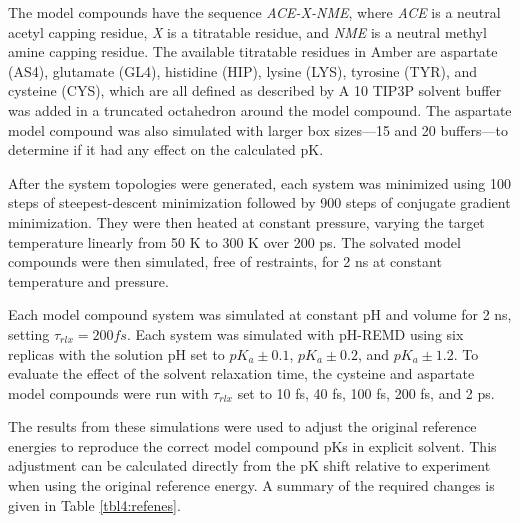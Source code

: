 The model compounds have the sequence \emph{ACE-X-NME}, where \emph{ACE} is a
neutral acetyl capping residue, \emph{X} is a titratable residue, and \emph{NME}
is a neutral methyl amine capping residue.
\cite{Mongan_JComputChem_2004_v25_p2038} The available titratable residues in
Amber are aspartate (AS4), glutamate (GL4), histidine (HIP), lysine (LYS),
tyrosine (TYR), and cysteine (CYS), which are all defined as described by
\citeauthor{Mongan_JComputChem_2004_v25_p2038}
\cite{Mongan_JComputChem_2004_v25_p2038}  A 10 \text{\AA} TIP3P
\cite{Jorgensen_JChemPhys_1983_v79_p926} solvent buffer was added in a truncated
octahedron around the model compound.  The aspartate model compound was also
simulated with larger box sizes---15 \text{\AA} and 20 \text{\AA} buffers---to
determine if it had any effect on the calculated pK.

After the system topologies were generated, each system was minimized using 100
steps of steepest-descent minimization followed by 900 steps of conjugate
gradient minimization.  They were then heated at constant pressure, varying the
target temperature linearly from 50 K to 300 K over 200 ps.  The solvated model
compounds were then simulated, free of restraints, for 2 ns at constant
temperature and pressure.

Each model compound system was simulated at constant pH and volume for 2 ns,
setting $\tau_{rlx} = 200 fs$. Each system was simulated with pH-REMD using six
replicas with the solution pH set to $pK_a \pm 0.1$, $pK_a \pm 0.2$, and $pK_a
\pm 1.2$. To evaluate the effect of the solvent relaxation time, the cysteine
and aspartate model compounds were run with $\tau_{rlx}$ set to 10 fs, 40 fs,
100 fs, 200 fs, and 2 ps.

The results from these simulations were used to adjust the original reference
energies to reproduce the correct model compound pKs in explicit solvent.
This adjustment can be calculated directly from the pK shift relative to
experiment when using the original reference energy. A summary of the required
changes is given in Table \ref{tbl4:refenes}.

